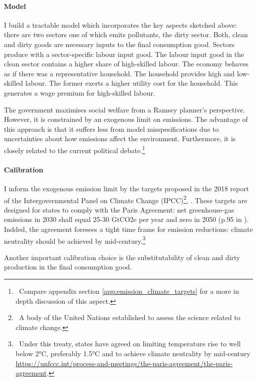\paragraph{Model}
I build a tractable model which incorporates the key aspects sketched above: there are two sectors one of which emits pollutants, the dirty sector. Both, clean and dirty goods are necessary inputs to the final consumption good. Sectors produce with a sector-specific labour input good. The labour input good in the clean sector contains a higher share of high-skilled labour. 
The economy behaves as if there was a representative household. The household provides high and low-skilled labour. The former exerts a higher utility cost for the household. This generates a wage premium for high-skilled labour. 

The government maximises social welfare from a Ramsey planner's perspective. However, it is constrained by an exogenous limit on emissions. The advantage of this approach is that it suffers less from  model misspesifications due to  uncertainties about how emissions affect the environment. Furthermore, it is closely related to the current political debate.\footnote{\ Compare appendix section \ref{app:emission_climate_targets} for a more in depth discussion of this aspect. } 

\paragraph{Calibration}
I inform the exogenous emission limit by the  targets proposed in the 2018 report of the Intergovernmental Panel on Climate Change (IPCC)\footnote{\ A body of the United Nations established to assess the science related to climate change.},  \cite{Rogelj2018MitigationDevelopment.}. These targets are designed for states to comply with the Paris Agreement: net greenhouse-gas emissions in 2030 shall equal 25-30 GtCO2e per year and zero in 2050 (p.95 in \cite{Rogelj2018MitigationDevelopment.}). Indded,  the agreement  foresees a tight time frame for emission reductions: climate neutrality should be achieved by mid-century.\footnote{\ Under this treaty, states have agreed on limiting temperature rise to well below 2°C, preferably 1.5°C and to achieve climate neutrality by mid-century \url{https://unfccc.int/process-and-meetings/the-paris-agreement/the-paris-agreement}. }

Another important calibration choice is the substitutability of clean and dirty production in the final consumption good. 

